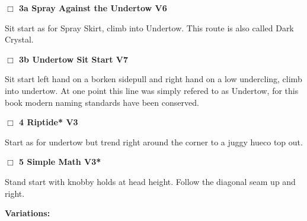 \begin{multicols}{2}
\begin{adjustwidth}{0.5cm}{}
\needspace{2em}
\label{vr:Spray Against the Undertow}
\colorbox{RoyalBlue!20}{
\parbox{0.95\linewidth}{
\hspace{-1ex}\textbf{$\Box$
3a Spray Against the Undertow V6  
}}}
\begin{adjustwidth}{1.3em}{}			

Sit start as for Spray Skirt, climb into Undertow. This route is also called Dark Crystal.
\end{adjustwidth}




\needspace{2em}
\label{vr:Undertow Sit Start}
\colorbox{Goldenrod!20}{
\parbox{0.95\linewidth}{
\hspace{-1ex}\textbf{$\Box$
3b Undertow Sit Start V7  
}}}
\begin{adjustwidth}{1.3em}{}			

Sit start left hand on a borken sidepull and right hand on a low undercling, climb into undertow. At one point this line was simply refered to as Undertow, for this book modern naming standards have been conserved.
\end{adjustwidth}



\end{adjustwidth}


\needspace{2em}
\label{rt:Riptide}
\colorbox{green!20}{
\parbox{0.95\linewidth}{
\hspace{-1ex}\textbf{$\Box$
4 Riptide* V3  
}}}
\begin{adjustwidth}{1.3em}{}			

Start as for undertow but trend right around the corner to a juggy hueco top out.
\end{adjustwidth}




\needspace{2em}
\label{rt:Simple Math}
\colorbox{green!20}{
\parbox{0.95\linewidth}{
\hspace{-1ex}\textbf{$\Box$
5 Simple Math V3*  
}}}
\begin{adjustwidth}{1.3em}{}			

Stand start with knobby holds at head height. Follow the diagonal seam up and right.
\end{adjustwidth}


\begin{adjustwidth}{0.5cm}{}				
\needspace{4em}
\textbf{Variations:} \newline


\end{adjustwidth}
\end{multicols}
